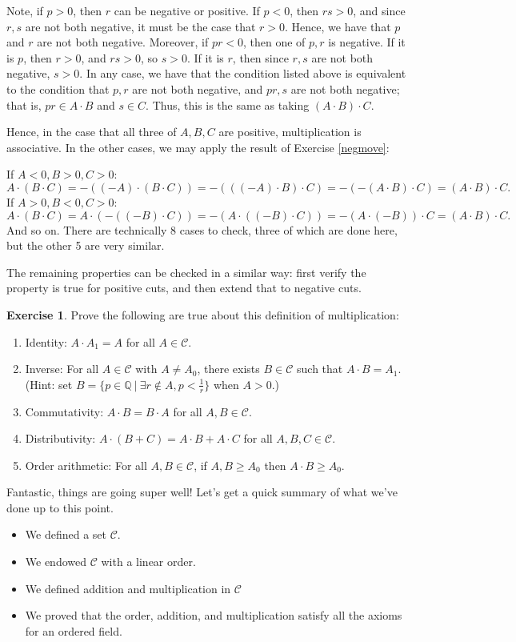 \documentclass{article}
\theoremstyle{definition}
\newtheorem{exercise}{Exercise}
\newcommand{\Q}{\mathbb{Q}}
\begin{document}
Note, if $p>0$, then $r$ can be negative or positive. If $p<0$, then $rs>0$, and since $r, s$ are not both negative, it must be the case that $r>0$. Hence, we have that $p$ and $r$ are not both negative. Moreover, if $pr<0$, then one of $p,r$ is negative. If it is $p$, then $r>0$, and $rs>0$, so $s>0$. If it is $r$, then since $r,s$ are not both negative, $s>0$. In any case, we have that the condition listed above is equivalent to the condition that $p, r$ are not both negative, and $pr, s$ are not both negative; that is, $pr\in A\cdot B$ and $s\in C$. Thus, this is the same as taking $(A\cdot B)\cdot C$.

Hence, in the case that all three of $A, B, C$ are positive, multiplication is associative. In the other cases, we may apply the result of Exercise \ref{negmove}:

\noindent If $A<0, B>0, C>0$:
\[A\cdot (B\cdot C) = -((-A)\cdot (B\cdot C))= -(((-A)\cdot B)\cdot C) = -(-(A\cdot B)\cdot C) = (A\cdot B)\cdot C.\]
If $A>0, B<0, C>0$:
\[A\cdot (B\cdot C) = A\cdot (-((-B)\cdot C)) = -(A\cdot ((-B)\cdot C)) = -(A\cdot (-B))\cdot C = (A\cdot B)\cdot C.\]
And so on. There are technically 8 cases to check, three of which are done here, but the other 5 are very similar. 

The remaining properties can be checked in a similar way: first verify the property is true for positive cuts, and then extend that to negative cuts.

\begin{exercise}Prove the following are true about this definition of multiplication:
\begin{enumerate}
\item Identity: $A\cdot A_1 = A$ for all $A\in \mathcal{C}$.
\item Inverse: For all $A\in \mathcal{C}$ with $A\neq A_0$, there exists $B\in \mathcal{C}$ such that $A\cdot B=A_1$. (Hint: set $B=\{p\in \Q\ | \ \exists r\notin A, p<\frac {1}{r}\}$ when $A>0$.)
\item Commutativity: $A\cdot B=B\cdot A$ for all $A, B\in \mathcal{C}$.
\item Distributivity: $A\cdot(B+C) = A\cdot B+A\cdot C$ for all $A, B, C\in \mathcal{C}$.
\item Order arithmetic: For all $A, B\in \mathcal{C}$, if $A, B\geq A_0$ then $A\cdot B\geq A_0$.
\end{enumerate}
\end{exercise}

Fantastic, things are going super well! Let's get a quick summary of what we've done up to this point.
\begin{itemize}
\item We defined a set $\mathcal{C}$.
\item We endowed $\mathcal{C}$ with a linear order.
\item We defined addition and multiplication in $\mathcal{C}$
\item We proved that the order, addition, and multiplication satisfy all the axioms for an ordered field.
\end{itemize}
\end{document}
